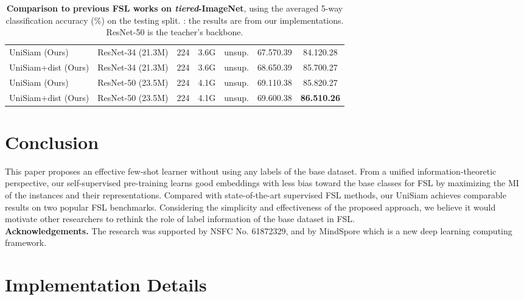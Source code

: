 \documentclass[runningheads]{llncs}
\begin{document}
\begin{table}[tbp]
{{\begin{tabular}{lcccccc}
    \midrule
    UniSiam (Ours)                                         & ResNet-34 (21.3M) & 224  & 3.6G  & unsup.     & 67.570.39         & 84.120.28 \\
    UniSiam+dist (Ours)                                    & ResNet-34 (21.3M) & 224  & 3.6G  & unsup.     & 68.650.39         & 85.700.27 \\
    UniSiam (Ours)                                         & ResNet-50 (23.5M) & 224  & 4.1G  & unsup.     & 69.110.38         & 85.820.27  \\
    UniSiam+dist (Ours)                                    & ResNet-50 (23.5M) & 224  & 4.1G  & unsup.     & 69.600.38         & \textbf{86.510.26} \\
    \bottomrule
  \end{tabular}
  }}
    \caption{\label{tab:sota_tiered} \textbf{Comparison to previous FSL works on \emph{tiered}-ImageNet}, using the averaged 5-way classification accuracy (\%) on the testing split. : the results are from our implementations. ResNet-50 is the teacher's backbone.}
\end{table}

\section{Conclusion}
This paper proposes an effective few-shot learner without using any labels of the base dataset. From a unified information-theoretic perspective, our self-supervised pre-training learns good embeddings with less bias toward the base classes for FSL by maximizing the MI of the instances and their representations. Compared with state-of-the-art supervised FSL methods, our UniSiam achieves comparable results on two popular FSL benchmarks. Considering the simplicity and effectiveness of the proposed approach, we believe it would motivate other researchers to rethink the role of label information of the base dataset in FSL. \\

\noindent\textbf{Acknowledgements.} The research was supported by NSFC No. 61872329, and by MindSpore \cite{mindspore} which is a new deep learning computing framework.



\clearpage




\clearpage


\appendix


\section{Implementation Details}
\end{document}
